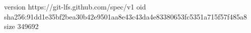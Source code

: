 version https://git-lfs.github.com/spec/v1
oid sha256:91dd1e35bf2bea30b42e9501aa8e43c43da4e83380653fc5351a715f57f485a8
size 349692
